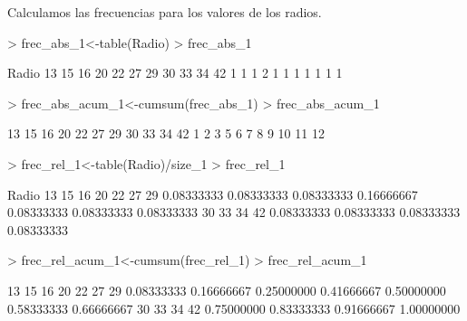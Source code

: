 \documentclass[a4paper]{article}
\begin{document}
Calculamos las frecuencias para los valores de los radios.
\begin{Schunk}
\begin{Sinput}
> frec_abs_1<-table(Radio)
> frec_abs_1
\end{Sinput}
\begin{Soutput}
Radio
13 15 16 20 22 27 29 30 33 34 42 
 1  1  1  2  1  1  1  1  1  1  1 
\end{Soutput}
\begin{Sinput}
> frec_abs_acum_1<-cumsum(frec_abs_1)
> frec_abs_acum_1
\end{Sinput}
\begin{Soutput}
13 15 16 20 22 27 29 30 33 34 42 
 1  2  3  5  6  7  8  9 10 11 12 
\end{Soutput}
\begin{Sinput}
> frec_rel_1<-table(Radio)/size_1
> frec_rel_1
\end{Sinput}
\begin{Soutput}
Radio
        13         15         16         20         22         27         29 
0.08333333 0.08333333 0.08333333 0.16666667 0.08333333 0.08333333 0.08333333 
        30         33         34         42 
0.08333333 0.08333333 0.08333333 0.08333333 
\end{Soutput}
\begin{Sinput}
> frec_rel_acum_1<-cumsum(frec_rel_1)
> frec_rel_acum_1
\end{Sinput}
\begin{Soutput}
        13         15         16         20         22         27         29 
0.08333333 0.16666667 0.25000000 0.41666667 0.50000000 0.58333333 0.66666667 
        30         33         34         42 
0.75000000 0.83333333 0.91666667 1.00000000 
\end{Soutput}
\end{Schunk}
\end{document}
